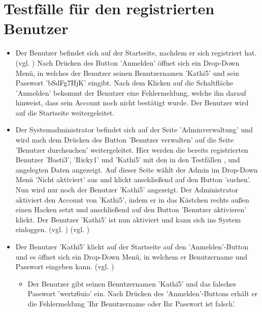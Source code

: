 \documentclass[a4paper]{scrreprt}
\newcounter{Lc}
\newcounter{Hc}
\newcommand{\stepHc}{\stepcounter{Hc}\setcounter{Lc}{0}}
\begin{document}
	\section{Testfälle für den registrierten Benutzer}
		\stepHc
		\begin{itemize}
			\item {}
			Der Benutzer befindet sich auf der Startseite, nachdem er sich registriert hat. (vgl. ) Nach Drücken des Button 'Anmelden' öffnet sich ein Drop-Down Menü, in welches der Benutzer seinen Benutzernamen 'Kathi5' und sein Passwort 'bSdFg7HjK' eingibt. Nach dem Klicken auf die Schaltfläche 'Anmelden' bekommt der Benutzer eine Fehlermeldung, welche ihn darauf hinweist, dass sein Account noch nicht bestätigt wurde. Der Benutzer wird auf die Startseite weitergeleitet.
			
			\item {}
			Der Systemadministrator befindet sich auf der Seite 'Adminverwaltung' und wird nach dem Drücken des Button 'Benutzer verwalten' auf die Seite 'Benutzer durchsuchen' weitergeleitet. Hier werden die bereits registrierten Benutzer 'Basti3', 'Ricky1' und 'Kathi5' mit den in den Testfällen ,  und  angelegten Daten angezeigt. Auf dieser Seite wählt der Admin im Drop-Down Menü 'Nicht aktiviert' aus und klickt anschließend auf den Button 'suchen'. Nun wird nur noch der Benutzer 'Kathi5' angezeigt. Der Administrator aktiviert den Account von 'Kathi5', indem er in das Kästchen rechts außen einen Hacken setzt und anschließend auf den Button 'Benutzer aktivieren' klickt. Der Benutzer 'Kathi5' ist nun aktiviert und kann sich ins System einloggen. (vgl. )  
			(vgl. )
			
			
			\item {} 
			Der Benutzer 'Kathi5' klickt auf der Startseite	auf den 'Anmelden'-Button und es öffnet sich ein Drop-Down Menü, in welchem er Benutzername und Passwort eingeben kann. (vgl. )
			\begin{itemize}
				\item Der Benutzer gibt seinen Benutzernamen 'Kathi5' und das falsches Passwort 'wertz6uio' ein. Nach Drücken des 'Anmelden'-Buttons erhält er die Fehlermeldung 'Ihr Benutzername oder Ihr Passwort ist falsch'.


\end{itemize}
\end{itemize}
\end{document}

